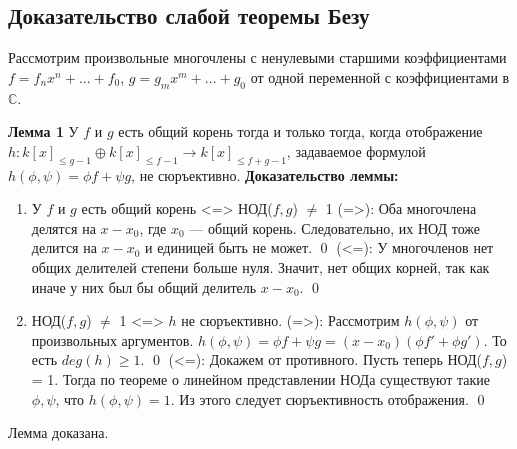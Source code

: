 \documentclass[a4paper, 12pt]{article}
\begin{document}
\subsection{Доказательство слабой теоремы Безу}

Рассмотрим произвольные многочлены с ненулевыми старшими коэффициентами $f=f_nx^n + ... + f_0$, $g=g_mx^m + ... + g_0$ от одной переменной с коэффициентами в $\mathbb{C}$.

\textbf{Лемма 1}
У $f$ и $g$ есть общий корень тогда и только тогда, когда отображение $h:k[x]_{\leq g-1} \oplus k[x]_{\leq f-1} \rightarrow k[x]_{\leq f+g-1}$, задаваемое формулой $h(\phi,\psi) = \phi f + \psi g$, не сюръективно.\newline\bigskip
\textbf{Доказательство леммы:}
\begin{enumerate}
  \item У $f$ и $g$ есть общий корень <=> НОД($f,g$) $\neq$ 1\newline
  (=>): Оба многочлена делятся на $x-x_0$, где $x_0$ --- общий корень. Следовательно, их НОД тоже делится на $x-x_0$ и единицей быть не может. \qed\newline
  (<=): У многочленов нет общих делителей степени больше нуля. Значит, нет общих корней, так как иначе у них был бы общий делитель $x-x_0$. \qed
  \item НОД($f,g$) $\neq$ 1 <=> $h$ не сюръективно.\newline
  (=>): Рассмотрим $h(\phi,\psi)$ от произвольных аргументов. $h(\phi,\psi)=\phi f + \psi g=(x-x_0)(\phi f' + \phi g')$. То есть $deg(h) \geq 1$. \qed\newline
  (<=): Докажем от противного. Пусть теперь НОД($f,g$) = 1. Тогда по теореме о линейном представлении НОДа существуют такие $\phi,\psi$, что $h(\phi,\psi)=1$. Из этого следует сюръективность отображения. \qed
\end{enumerate}
Лемма доказана.
\end{document}
